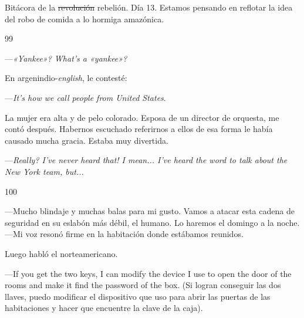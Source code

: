 \documentclass[12pt,twoside,openright,a5paper]{book}
\begin{document}
\nopagebreak

\vspace{0.5cm}

\nopagebreak

Bitácora de la \st{revolución} rebelión. Día 13. Estamos pensando en reflotar la idea
del robo de comida a lo hormiga amazónica.

\vspace{0.5cm}

\hrulefill \hspace{0.1cm}\decofourleft\hspace{0.2cm} 99 \hspace{0.2cm}\decofourright \hspace{0.1cm}\hrulefill

\nopagebreak

\vspace{0.5cm}

\nopagebreak

---\emph{«Yankee»? What's a «yankee»?}

En argenindio-\emph{english}, le contesté:

---\emph{It's how we call people from United States}.

La mujer era alta y de pelo colorado. Esposa de un director de orquesta, me contó después. Habernos escuchado referirnos a ellos de esa forma le había causado mucha gracia. Estaba muy divertida. 

---\emph{Really? I've never heard that! I mean... I've heard the word to talk about the New York team, but...}

\vspace{0.5cm}

\hrulefill \hspace{0.1cm}\decofourleft\hspace{0.2cm} 100 \hspace{0.2cm}\decofourright \hspace{0.1cm}\hrulefill

\nopagebreak

\vspace{0.5cm}

\nopagebreak

---Mucho blindaje y muchas balas para mi gusto. Vamos a atacar esta cadena
de seguridad en su eslabón más débil, el humano. Lo haremos el domingo a la noche. ---Mi voz resonó firme en la habitación
donde estábamos reunidos.

Luego habló el norteamericano.

---If you get the two keys, I can modify the device I use to open the door of the rooms 
and make it find the password of the box. (Si logran conseguir las dos llaves, 
puedo modificar el dispositivo que uso para abrir las puertas de las habitaciones y 
hacer que encuentre la clave de la caja).
\end{document}
